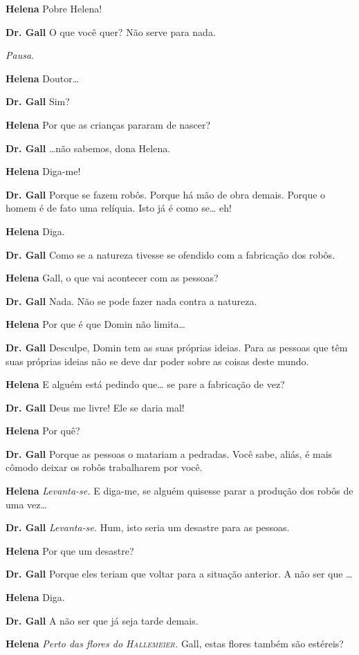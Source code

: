 \textbf{Helena} Pobre Helena!

\textbf{Dr. Gall} O que você quer? Não serve para nada.

\emph{Pausa.}

\textbf{Helena} Doutor\ldots{}

\textbf{Dr. Gall} Sim?

\textbf{Helena} Por que as crianças pararam de nascer?

\textbf{Dr. Gall} \ldots{}não sabemos, dona Helena.

\textbf{Helena} Diga-me!

\textbf{Dr. Gall} Porque se fazem robôs. Porque há mão de obra demais. Porque o homem é
de fato uma relíquia. Isto já é como se\ldots{} eh!

\textbf{Helena} Diga.

\textbf{Dr. Gall} Como se a natureza tivesse se ofendido com a fabricação dos robôs.

\textbf{Helena} Gall, o que vai acontecer com as pessoas?

\textbf{Dr. Gall} Nada. Não se pode fazer nada contra a natureza.

\textbf{Helena} Por que é que Domin não limita\ldots{}

\textbf{Dr. Gall} Desculpe, Domin tem as suas próprias ideias. Para as pessoas que têm
suas próprias ideias não se deve dar poder sobre as coisas deste mundo.

\textbf{Helena} E alguém está pedindo que\ldots{} se pare a fabricação de vez?

\textbf{Dr. Gall} Deus me livre! Ele se daria mal!

\textbf{Helena} Por quê?

\textbf{Dr. Gall} Porque as pessoas o matariam a pedradas. Você sabe, aliás, é mais
cômodo deixar os robôs trabalharem por você.

\textbf{Helena} \emph{Levanta-se.} E diga-me, se alguém quisesse parar a produção dos
robôs de uma vez\ldots{}

\textbf{Dr. Gall} \emph{Levanta-se.} Hum, isto seria um desastre para as pessoas.

\textbf{Helena} Por que um desastre?

\textbf{Dr. Gall} Porque eles teriam que voltar para a situação anterior. A não ser que
\ldots{}

\textbf{Helena} Diga.

\textbf{Dr. Gall} A não ser que já seja tarde demais.

\textbf{Helena} \emph{Perto das flores do \textsc{Hallemeier}.} Gall, estas flores também são
estéreis?

